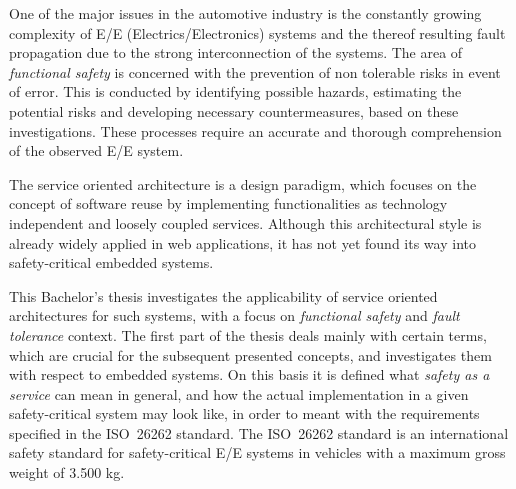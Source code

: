One of the major issues in the automotive industry is the constantly growing complexity of E/E (Electrics/Electronics) systems and the thereof resulting fault propagation due to the strong interconnection of the systems. The area of \emph{functional safety} is concerned with the prevention of non tolerable risks in event of error. This is conducted by identifying possible hazards, estimating the potential risks and developing necessary countermeasures, based on these investigations. These processes require an accurate and thorough comprehension of the observed E/E system.

The service oriented architecture is a design paradigm, which focuses on the concept of software reuse by implementing functionalities as technology independent and loosely coupled services. Although this architectural style is already widely applied in web applications, it has not yet found its way into safety-critical embedded systems.

This Bachelor's thesis investigates the applicability of service oriented architectures for such systems, with a focus on \emph{functional safety} and \emph{fault tolerance} context. The first part of the thesis deals mainly with certain terms, which are crucial for the subsequent presented concepts, and investigates them with respect to embedded systems. On this basis it is defined what \emph{safety as a service} can mean in general, and how the actual implementation in a given safety-critical system may look like, in order to meant with the requirements specified in the \mbox{ISO 26262} standard. The \mbox{ISO 26262} standard is an international safety standard for safety-critical E/E systems in vehicles with a maximum gross weight of 3.500 kg.